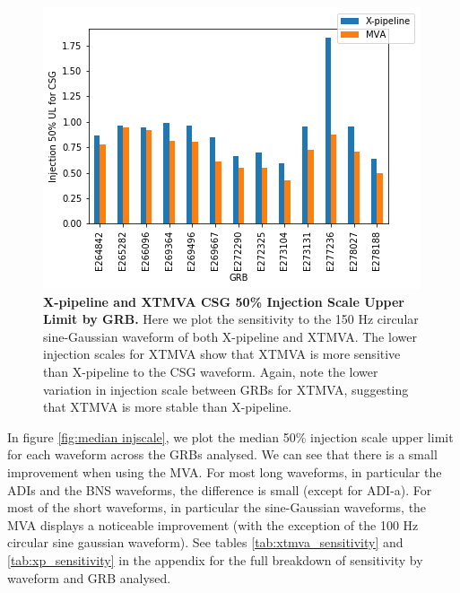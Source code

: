 \documentclass[11pt]{cuthesis}
\newcommand{\xp}{X-pipeline }
\newcommand{\xpfs}{X-pipeline. }
\begin{document}
\begin{figure} %
\begin{center}
\includegraphics[width=1.0\linewidth]{csg_injscale_comparison.png}
\end{center}
\caption{\textbf{\xp and XTMVA  CSG 50\% Injection Scale Upper Limit by GRB.} Here we plot the sensitivity to the 150 Hz circular sine-Gaussian waveform of both \xp and XTMVA. The lower injection scales for XTMVA show that XTMVA is more sensitive than \xp to the CSG waveform. Again, note the lower variation in injection scale between GRBs for XTMVA, suggesting that XTMVA is more stable than \xpfs }
\label{fig:csg comparison}
\end{figure}

In figure \ref{fig:median injscale}, we plot the median 50\% injection scale upper limit for each waveform across the GRBs analysed. We can see that there is a small improvement when using the MVA. For most long waveforms, in particular the ADIs and the BNS waveforms, the difference is small (except for ADI-a). For most of the short waveforms, in particular the sine-Gaussian waveforms, the MVA displays a noticeable improvement (with the exception of the 100 Hz circular sine gaussian waveform). See tables \ref{tab:xtmva_sensitivity} and \ref{tab:xp_sensitivity} in the appendix for the full breakdown of sensitivity by waveform and GRB analysed.
\end{document}
